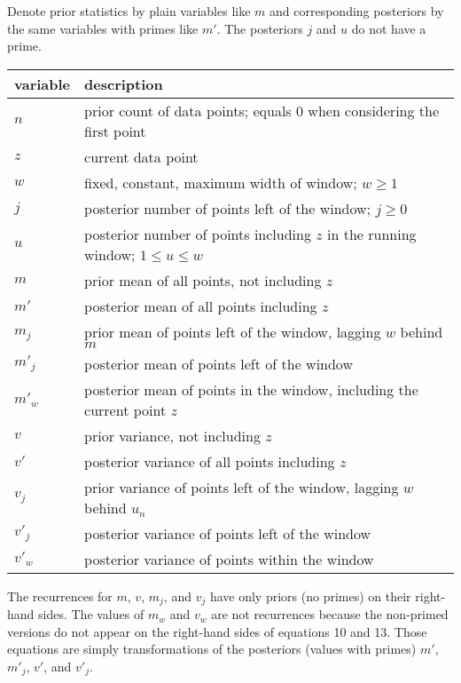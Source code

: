 \documentclass[10pt,oneside,x11names]{article}
\begin{document}
Denote prior statistics by plain variables like \(m\) and corresponding
posteriors by the same variables with primes like \(m'\). The posteriors
\(j\) and \(u\) do not have a prime.

\begin{center}
\begin{tabular}{ll}
variable & description\\
\hline
\(n\) & prior count of data points; equals \(0\) when considering the first point\\
\(z\) & current data point\\
\(w\) & fixed, constant, maximum width of window; \(w\geq{1}\)\\
\(j\) & posterior number of points left of the window; \(j\geq{0}\)\\
\(u\) & posterior number of points including \(z\) in the running window; \(1\leq{u}\leq{w}\)\\
\(m\) & prior mean of all points, not including \(z\)\\
\(m'\) & posterior mean of all points including \(z\)\\
\(m_j\) & prior mean of points left of the window, lagging \(w\) behind \(m\)\\
\(m'_j\) & posterior mean of points left of the window\\
\(m'_w\) & posterior mean of points in the window, including the current point \(z\)\\
\(v\) & prior variance, not including \(z\)\\
\(v'\) & posterior variance of all points including \(z\)\\
\(v_j\) & prior variance of points left of the window, lagging \(w\) behind \(u_n\)\\
\(v'_j\) & posterior variance of points left of the window\\
\(v'_w\) & posterior variance of points within the window\\
\end{tabular}
\end{center}

The recurrences for \(m\), \(v\), \(m_j\), and \(v_j\) have only priors (no
primes) on their right-hand sides. The values of \(m_w\) and \(v_w\) are not
recurrences because the non-primed versions do not appear on the
right-hand sides of equations 10 and 13. Those equations are simply
transformations of the posteriors (values with primes) \(m'\), \(m'_j\),
\(v'\), and \(v'_j\).
\end{document}
